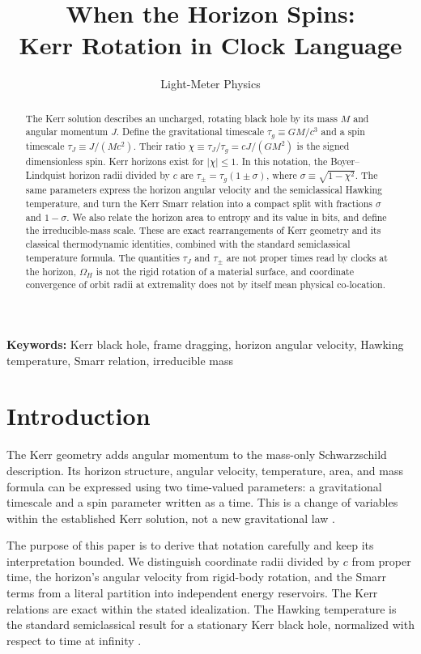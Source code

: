 \documentclass[12pt]{article}
\title{When the Horizon Spins:\\
Kerr Rotation in Clock Language}
\author{Light-Meter Physics}
\date{}
\begin{document}
\maketitle

\begin{abstract}
The Kerr solution describes an uncharged, rotating black hole by its mass $M$ and angular momentum $J$. Define the gravitational timescale $\tau_g\equiv GM/c^3$ and a spin timescale $\tau_J\equiv J/(Mc^2)$. Their ratio $\chi\equiv\tau_J/\tau_g=cJ/(GM^2)$ is the signed dimensionless spin. Kerr horizons exist for $|\chi|\leq1$. In this notation, the Boyer--Lindquist horizon radii divided by $c$ are $\tau_\pm=\tau_g(1\pm\sigma)$, where $\sigma\equiv\sqrt{1-\chi^2}$. The same parameters express the horizon angular velocity and the semiclassical Hawking temperature, and turn the Kerr Smarr relation into a compact split with fractions $\sigma$ and $1-\sigma$. We also relate the horizon area to entropy and its value in bits, and define the irreducible-mass scale. These are exact rearrangements of Kerr geometry and its classical thermodynamic identities, combined with the standard semiclassical temperature formula. The quantities $\tau_J$ and $\tau_\pm$ are not proper times read by clocks at the horizon, $\Omega_H$ is not the rigid rotation of a material surface, and coordinate convergence of orbit radii at extremality does not by itself mean physical co-location.
\end{abstract}

\noindent\textbf{Keywords:} Kerr black hole, frame dragging, horizon angular velocity, Hawking temperature, Smarr relation, irreducible mass

\section{Introduction}

The Kerr geometry adds angular momentum to the mass-only Schwarzschild description. Its horizon structure, angular velocity, temperature, area, and mass formula can be expressed using two time-valued parameters: a gravitational timescale and a spin parameter written as a time. This is a change of variables within the established Kerr solution, not a new gravitational law \cite{Kerr,BardeenPressTeukolsky}.

The purpose of this paper is to derive that notation carefully and keep its interpretation bounded. We distinguish coordinate radii divided by $c$ from proper time, the horizon's angular velocity from rigid-body rotation, and the Smarr terms from a literal partition into independent energy reservoirs. The Kerr relations are exact within the stated idealization. The Hawking temperature is the standard semiclassical result for a stationary Kerr black hole, normalized with respect to time at infinity \cite{BardeenCarterHawking,Hawking}.
\end{document}
